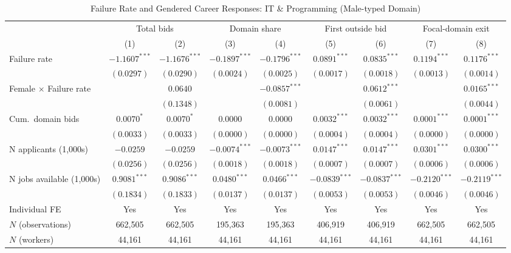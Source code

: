 \documentclass[12pt]{article}
\begin{document}
\begin{table}
\centering
\def\sym#1{\ifmmode^{#1}\else\(^{#1}\)\fi}
\caption{Failure Rate and Gendered Career Responses: IT \& Programming (Male-typed Domain)}
\label{tab:table3}
\small
\begin{tabular}{lcccccccc}
\hline\hline
  & \multicolumn{2}{c}{Total bids} & \multicolumn{2}{c}{Domain share} & \multicolumn{2}{c}{First outside bid} & \multicolumn{2}{c}{Focal-domain exit} \\
\cmidrule(lr){2-3}
\cmidrule(lr){4-5}
\cmidrule(lr){6-7}
\cmidrule(lr){8-9}
  & (1) & (2) & (3) & (4) & (5) & (6) & (7) & (8) \\
\hline
Failure rate & $-1.1607^{***}$ & $-1.1676^{***}$ & $-0.1897^{***}$ & $-0.1796^{***}$ & $0.0891^{***}$ & $0.0835^{***}$ & $0.1194^{***}$ & $0.1176^{***}$ \\
  & $(0.0297)$ & $(0.0290)$ & $(0.0024)$ & $(0.0025)$ & $(0.0017)$ & $(0.0018)$ & $(0.0013)$ & $(0.0014)$ \\[4pt]
Female $\times$ Failure rate &  & $0.0640$ &  & $-0.0857^{***}$ &  & $0.0612^{***}$ &  & $0.0165^{***}$ \\
  &  & $(0.1348)$ &  & $(0.0081)$ &  & $(0.0061)$ &  & $(0.0044)$ \\[4pt]
Cum.\ domain bids & $0.0070^{*}$ & $0.0070^{*}$ & $0.0000$ & $0.0000$ & $0.0032^{***}$ & $0.0032^{***}$ & $0.0001^{***}$ & $0.0001^{***}$ \\
  & $(0.0033)$ & $(0.0033)$ & $(0.0000)$ & $(0.0000)$ & $(0.0004)$ & $(0.0004)$ & $(0.0000)$ & $(0.0000)$ \\[4pt]
N applicants (1,000s) & $-0.0259$ & $-0.0259$ & $-0.0074^{***}$ & $-0.0073^{***}$ & $0.0147^{***}$ & $0.0147^{***}$ & $0.0301^{***}$ & $0.0300^{***}$ \\
  & $(0.0256)$ & $(0.0256)$ & $(0.0018)$ & $(0.0018)$ & $(0.0007)$ & $(0.0007)$ & $(0.0006)$ & $(0.0006)$ \\[4pt]
N jobs available (1,000s) & $0.9081^{***}$ & $0.9086^{***}$ & $0.0480^{***}$ & $0.0466^{***}$ & $-0.0839^{***}$ & $-0.0837^{***}$ & $-0.2120^{***}$ & $-0.2119^{***}$ \\
  & $(0.1834)$ & $(0.1833)$ & $(0.0137)$ & $(0.0137)$ & $(0.0053)$ & $(0.0053)$ & $(0.0046)$ & $(0.0046)$ \\[4pt]
\hline
Individual FE & Yes & Yes & Yes & Yes & Yes & Yes & Yes & Yes \\
$N$ (observations) & 662,505 & 662,505 & 195,363 & 195,363 & 406,919 & 406,919 & 662,505 & 662,505 \\
$N$ (workers) & 44,161 & 44,161 & 44,161 & 44,161 & 44,161 & 44,161 & 44,161 & 44,161 \\

\end{tabular}
\end{table}
\end{document}
